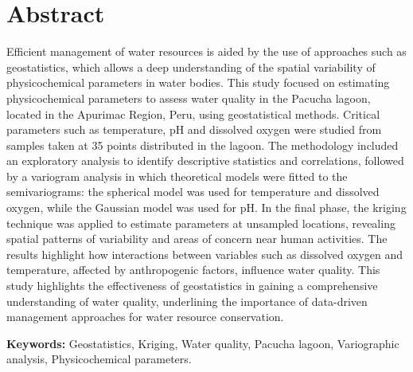 \newpage
\section*{Abstract}

Efficient management of water resources is aided by the use of approaches such as geostatistics, which allows a deep understanding of the spatial variability of physicochemical parameters in water bodies. This study focused on estimating physicochemical parameters to assess water quality in the Pacucha lagoon, located in the Apurimac Region, Peru, using geostatistical methods. Critical parameters such as temperature, pH and dissolved oxygen were studied from samples taken at 35 points distributed in the lagoon. The methodology included an exploratory analysis to identify descriptive statistics and correlations, followed by a variogram analysis in which theoretical models were fitted to the semivariograms: the spherical model was used for temperature and dissolved oxygen, while the Gaussian model was used for pH. In the final phase, the kriging technique was applied to estimate parameters at unsampled locations, revealing spatial patterns of variability and areas of concern near human activities. The results highlight how interactions between variables such as dissolved oxygen and temperature, affected by anthropogenic factors, influence water quality. This study highlights the effectiveness of geostatistics in gaining a comprehensive understanding of water quality, underlining the importance of data-driven management approaches for water resource conservation.

\textbf{Keywords:} Geostatistics, Kriging, Water quality, Pacucha lagoon, Variographic analysis, Physicochemical parameters.

